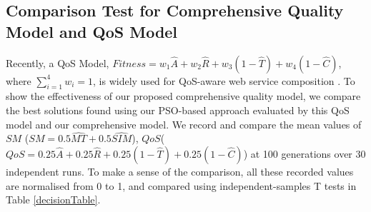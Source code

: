 \documentclass{llncs}
\begin{document}
\subsection{Comparison Test for Comprehensive Quality Model and QoS Model}\label{comparisonTest}

Recently, a QoS Model, $Fitness = w_1 \hat{A} + w_2 \hat{R} + w_3(1 - \hat{T}) + w_4(1 - \hat{C})$, where $\sum_{i=1}^{4} w_i = 1$, is widely used for QoS-aware web service composition \cite{ma2015hybrid,da2016particle,da2015graphevol}. To show the effectiveness of our proposed comprehensive quality model, we compare the best solutions found using our PSO-based approach evaluated by this QoS model and our comprehensive model. We record and compare the mean values of $SM$ ($SM = 0.5 \hat{MT} + 0.5 \hat{SIM}$), $QoS$($QoS = 0.25 \hat{A} + 0.25 \hat{R} + 0.25(1 - \hat{T}) + 0.25(1 - \hat{C})$) at 100 generations over 30 independent runs. To make a sense of the comparison, all these recorded values are normalised from 0 to 1, and compared using independent-samples T tests in Table \ref{decisionTable}. 
\end{document}
